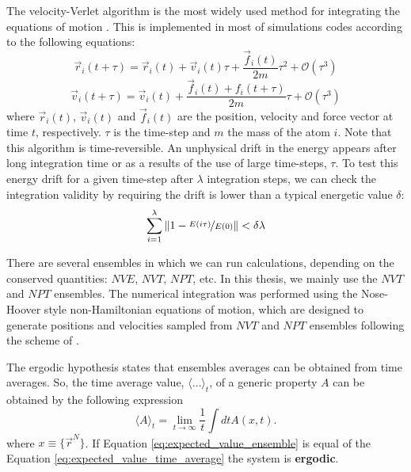 The velocity-Verlet algorithm is the most widely used method for integrating the equations of motion \cite{frenkel1996understanding}. This is implemented in most of simulations codes according to the following equations:
\begin{equation}
\label{verlet1}
\vec{r}_i(t+\tau)=\vec{r}_i(t)+\vec{v}_i(t)\tau +\frac{\vec{f}_i(t)}{2m}\tau^2+\mathcal{O}(\tau^3)
\end{equation}
\begin{equation}
\label{verlet2}
\vec{v}_i(t+\tau)=\vec{v}_i(t)+\frac{\vec{f}_i(t)+f_i(t+\tau)}{2m}\tau+\mathcal{O}(\tau^3)
\end{equation}
where $\vec{r}_i(t)$, $\vec{v}_i(t)$ and $\vec{f}_i(t)$ are the position, velocity and force vector at time $t$, respectively. $\tau$ is the time-step and $m$ the mass of the atom $i$. Note that this algorithm is time-reversible. An unphysical drift in the energy appears after long integration time or as a results of the use of large time-steps, $\tau$. To test this energy drift for a given time-step after $\lambda$ integration steps, we can check the integration validity by requiring the drift is lower than a typical energetic value $\delta$:
\begin{equation}
\label{verlet3}
\sum_{i=1}^{\lambda}{\left\lVert1-\nicefrac{E(i\tau)}{E(0)}\right\rVert}< \delta\lambda
\end{equation}

There are several ensembles in which we can run calculations, depending on the conserved quantities: $NVE$, $NVT$, $NPT$, etc. In this thesis, we mainly use the $NVT$ and $NPT$ ensembles. The numerical integration was performed using the Nose-Hoover style non-Hamiltonian equations of motion, which are designed to generate positions and velocities sampled from $NVT$ and $NPT$ ensembles following the scheme of \citet{martynatobiasklein,martyna}.

The ergodic hypothesis states that ensembles averages can be obtained from time averages. So, the time average value, $\langle\ldots\rangle_t$, of a generic property $A$ can be obtained by the following expression
\begin{equation}
\label{eq:expected_value_time_average}
\langle A \rangle_t = \lim_{t\rightarrow\infty}{\frac{1}{t}\int{dt A(x,t)}}.
\end{equation} where $x\equiv\{\vec{r}^N\}$. If Equation \ref{eq:expected_value_ensemble} is equal of the Equation \ref{eq:expected_value_time_average} the system is \textbf{ergodic}.


